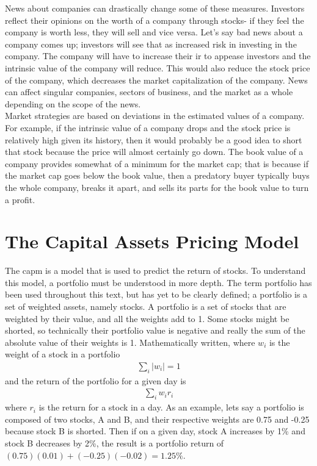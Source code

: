 News about companies can drastically change some of these measures. Investors reflect their opinions on the worth of a company through stocks- if they feel the company is worth less, they will sell and vice versa. Let's say bad news about a company comes up; investors will see that as increased risk in investing in the company. The company will have to increase their \ac{ir} to appease investors and the intrinsic value of the company will reduce. This would also reduce the stock price of the company, which decreases the market capitalization of the company. News can affect singular companies, sectors of business, and the market as a whole depending on the scope of the news. \\

Market strategies are based on deviations in the estimated values of a company. For example, if the intrinsic value of a company drops and the stock price is relatively high given its history, then it would probably be a good idea to short that stock because the price will almost certainly go down. The book value of a company provides somewhat of a minimum for the market cap; that is because if the market cap goes below the book value, then a predatory buyer typically buys the whole company, breaks it apart, and sells its parts for the book value to turn a profit.
\newpage
\section{The Capital Assets Pricing Model}
The \ac{capm} is a model that is used to predict the return of stocks. To understand this model, a portfolio must be understood in more depth. The term portfolio has been used throughout this text, but has yet to be clearly defined; a portfolio is a set of weighted assets, namely stocks. A portfolio is a set of stocks that are weighted by their value, and all the weights add to 1. Some stocks might be shorted, so technically their portfolio value is negative and really the sum of the absolute value of their weights is 1. Mathematically written, where $w_i$ is the weight of a stock in a portfolio
\begin{align*}
\sum_i |w_i|=1
\end{align*}
and the return of the portfolio for a given day is
\begin{align*}
\sum_iw_ir_i
\end{align*}
where $r_i$ is the return for a stock in a day. As an example, lets say a portfolio is composed of two stocks, A and B, and their respective weights are 0.75 and -0.25 because stock B is shorted. Then if on a given day, stock A increases by 1\% and stock B decreases by 2\%, the result is a portfolio return of $(0.75)(0.01)+(-0.25)(-0.02)=1.25\%$. \\

